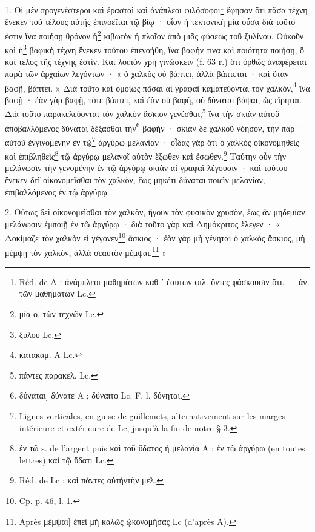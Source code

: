 \documentclass[a4paper, 11pt, oneside, polutonikogreek, french]{article}
\begin{document}
1. Οἱ μὲν προγενέστεροι καὶ ἐρασταὶ καὶ ἀνάπλεοι φιλόσοφοι\footnote{Réd. de A : ἀνάμπλεοι μαθημάτων καθ ᾽ ἑαυτων φιλ. ὄντες φάσκουσιν ὅτι. --- ἀν. τῶν μαθημάτων Lc.} ἔφησαν ὅτι πᾶσα τέχνη ἕνεκεν τοῦ τέλους αὐτῆς ἐπινοεῖται τῷ βίῳ · οἷον ἡ τεκτονικὴ μία οὖσα διὰ τοῦτό ἐστιν ἵνα ποιήσῃ θρόνον ἢ\footnote{μία ο. τῶν τεχνῶν Lc.} κιβωτὸν ἢ πλοῖον ἀπὸ μιᾶς φύσεως τοῦ ξυλίνου. Οὐκοῦν καὶ ἡ\footnote{ξύλου Lc.} βαφικὴ τέχνη ἕνεκεν τούτου ἐπενοήθη, ἵνα βαφήν τινα καὶ ποιότητα ποιήσῃ, ὃ καὶ τέλος τῆς τέχνης ἐστίν. Καὶ λοιπὸν χρὴ γινώσκειν (f. 63 r.) ὅτι ὀρθῶς ἀναφέρεται παρὰ τῶν ἀρχαίων λεγόντων · « ὁ χαλκὸς οὐ βάπτει, ἀλλὰ βάπτεται · καὶ ὅταν βαφῇ, βάπτει. » Διὰ τοῦτο καὶ ὁμοίως πᾶσαι αἱ γραφαὶ καματεύονται τὸν χαλκὸν,\footnote{κατακαμ. A Lc.} ἵνα βαφῇ · ἐὰν γὰρ βαφῇ, τότε βάπτει, καὶ ἐὰν οὐ βαφῆ, οὐ δύναται βάψαι, ὡς εἴρηται. Διὰ τοῦτο παρακελεύονται τὸν χαλκὸν ἄσκιον γενέσθαι,\footnote{πάντες παρακελ. Lc.} ἵνα τὴν σκιὰν αὐτοῦ ἀποβαλλόμενος δύναται δέξασθαι τὴν\footnote{δύναται] δύνατε A ; δύναιτο Lc. F. l. δύνηται.} βαφήν · σκιὰν δὲ χαλκοῦ νόησον, τὴν παρ ᾽ αὐτοῦ ἐνγινομένην ἐν τῷ\footnote{Lignes verticales, en guise de guillemets, alternativement sur les marges intérieure et extérieure de Lc, jusqu'à la fin de notre § 3.} ἀργύρῳ μελανίαν · οἶδας γὰρ ὅτι ὁ χαλκὸς οἰκονομηθεὶς καὶ ἐπιβληθεὶς\footnote{ἐν τῶ s. de l'argent puis καὶ τοῦ ὕδατος ἡ μελανία A ; ἐν τῷ ἀργύρω (en toutes lettres) καὶ τῷ ὕδατι Lc.} τῷ ἀργύρῳ μελανοῖ αὐτὸν ἔξωθεν καὶ ἔσωθεν.\footnote{Réd. de Lc : καὶ πάντες αὐτὴντὴν μελ.} Ταύτην οὖν τὴν μελάνωσιν τὴν γενομένην ἐν τῷ ἀργύρῳ σκιὰν αἱ γραφαὶ λέγουσιν · καὶ τούτου ἕνεκεν δεῖ οἰκονομεῖσθαι τὸν χαλκὸν, ἕως μηκέτι δύναται ποιεῖν μελανίαν, ἐπιβαλλόμενος ἐν τῷ ἀργύρῳ.

2. Οὕτως δεῖ οἰκονομεῖσθαι τὸν χαλκὸν, ἤγουν τὸν φυσικὸν χρυσὸν, ἕως ἂν μηδεμίαν μελάνωσιν ἐμποιῇ ἐν τῷ ἀργύρῳ · διὰ τοῦτο γὰρ καὶ Δημόκριτος ἔλεγεν · « Δοκίμαζε τὸν χαλκὸν εἰ γέγονεν\footnote{Cp. p. 46, l. 1.} ἄσκιος · ἐὰν γὰρ μὴ γένηται ὁ χαλκὸς ἄσκιος, μὴ μέμψῃ τὸν χαλκὸν, ἀλλὰ σεαυτὸν μέμψαι.\footnote{Après μέμψαι] ἐπεὶ μὴ καλῶς ᾠκονομήσας Lc (d'après A).} »
\end{document}
